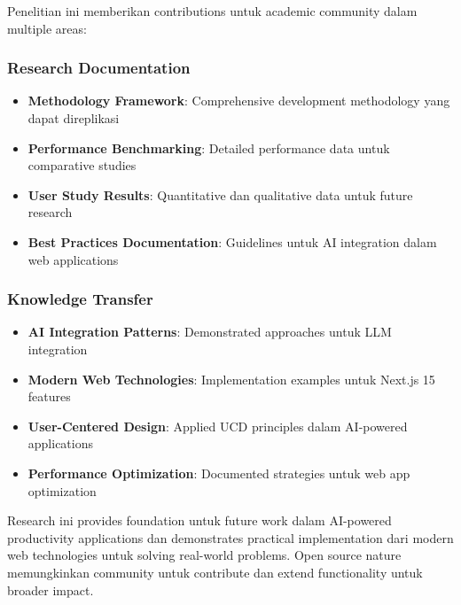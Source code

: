 Penelitian ini memberikan contributions untuk academic community dalam multiple areas:

\subsubsection{Research Documentation}

\begin{itemize}
\item \textbf{Methodology Framework}: Comprehensive development methodology yang dapat direplikasi
\item \textbf{Performance Benchmarking}: Detailed performance data untuk comparative studies
\item \textbf{User Study Results}: Quantitative dan qualitative data untuk future research
\item \textbf{Best Practices Documentation}: Guidelines untuk AI integration dalam web applications
\end{itemize}

\subsubsection{Knowledge Transfer}

\begin{itemize}
\item \textbf{AI Integration Patterns}: Demonstrated approaches untuk LLM integration
\item \textbf{Modern Web Technologies}: Implementation examples untuk Next.js 15 features
\item \textbf{User-Centered Design}: Applied UCD principles dalam AI-powered applications
\item \textbf{Performance Optimization}: Documented strategies untuk web app optimization
\end{itemize}

Research ini provides foundation untuk future work dalam AI-powered productivity applications dan demonstrates practical implementation dari modern web technologies untuk solving real-world problems. Open source nature memungkinkan community untuk contribute dan extend functionality untuk broader impact.